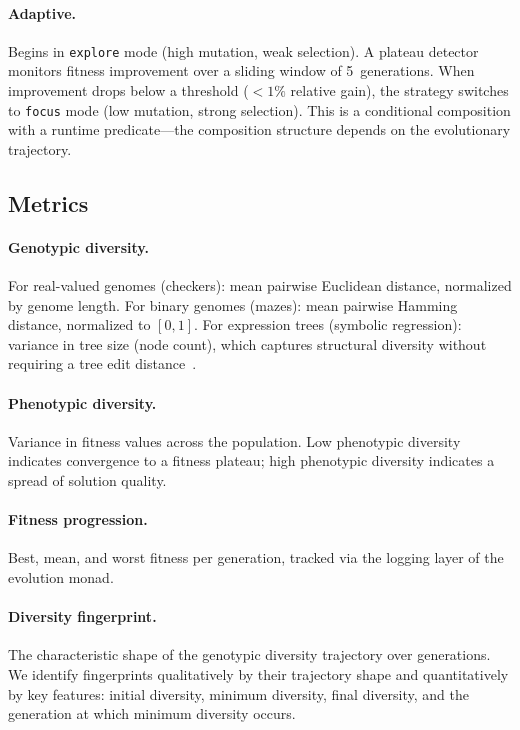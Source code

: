 \documentclass[sigconf]{acmart}
\begin{document}
\paragraph{Adaptive.}
Begins in \texttt{explore} mode (high mutation, weak selection). A plateau detector monitors fitness improvement over a sliding window of 5~generations. When improvement drops below a threshold ($<1\%$ relative gain), the strategy switches to \texttt{focus} mode (low mutation, strong selection). This is a conditional composition with a runtime predicate---the composition structure depends on the evolutionary trajectory.

\subsection{Metrics}

\paragraph{Genotypic diversity.}
For real-valued genomes (checkers): mean pairwise Euclidean distance, normalized by genome length. For binary genomes (mazes): mean pairwise Hamming distance, normalized to $[0, 1]$. For expression trees (symbolic regression): variance in tree size (node count), which captures structural diversity without requiring a tree edit distance~\cite{burke2004diversity}.

\paragraph{Phenotypic diversity.}
Variance in fitness values across the population. Low phenotypic diversity indicates convergence to a fitness plateau; high phenotypic diversity indicates a spread of solution quality.

\paragraph{Fitness progression.}
Best, mean, and worst fitness per generation, tracked via the logging layer of the evolution monad.

\paragraph{Diversity fingerprint.}
The characteristic shape of the genotypic diversity trajectory over generations. We identify fingerprints qualitatively by their trajectory shape and quantitatively by key features: initial diversity, minimum diversity, final diversity, and the generation at which minimum diversity occurs.
\end{document}
